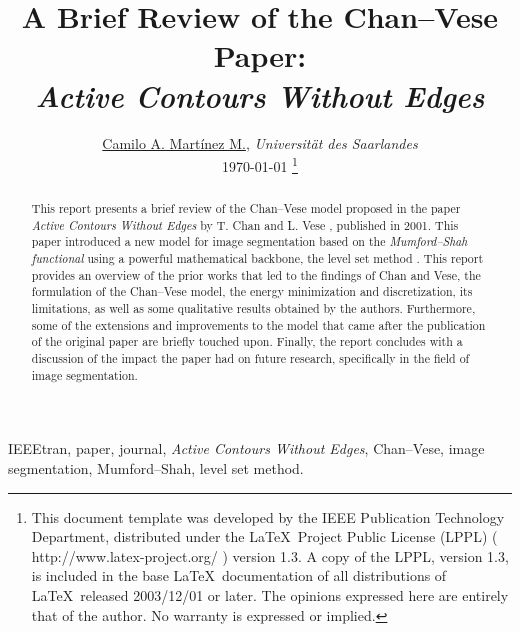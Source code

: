 \documentclass[journal]{IEEEtran}
\begin{document}
\title{\textbf{A Brief Review of the Chan--Vese Paper}: \\ \textit{Active Contours Without Edges}}
\author{\href{https://github.com/CamiloMartinezM}{Camilo A. Martínez M.}, \textit{Universität des Saarlandes} \\
    \vspace*{0.5\baselineskip} \today \vspace*{-\baselineskip}
    \thanks{This document template was developed by the IEEE Publication Technology Department, distributed under the \LaTeX \ Project Public License (LPPL) ( http://www.latex-project.org/ ) version 1.3. A copy of the LPPL, version 1.3, is included in the base \LaTeX \ documentation of all distributions of \LaTeX \ released 2003/12/01 or later. The opinions expressed here are entirely that of the author. No warranty is expressed or implied.}}

\maketitle

\begin{abstract}
    This report presents a brief review of the Chan--Vese model proposed in the paper \emph{Active Contours Without Edges} by T. Chan and L. Vese \cite{ChanVese}, published in 2001. This paper introduced a new model for image segmentation based on the \emph{Mumford--Shah functional} using a powerful mathematical backbone, the level set method \cite{Osher1988}. This report provides an overview of the prior works that led to the findings of Chan and Vese, the formulation of the Chan--Vese model, the energy minimization and discretization, its limitations, as well as some qualitative results obtained by the authors. Furthermore, some of the extensions and improvements to the model that came after the publication of the original paper are briefly touched upon. Finally, the report concludes with a discussion of the impact the paper had on future research, specifically in the field of image segmentation.
\end{abstract}

\begin{IEEEkeywords}
    IEEEtran, paper, journal, \textit{Active Contours Without Edges}, Chan--Vese, image segmentation, Mumford--Shah, level set method.
\end{IEEEkeywords}
\end{document}
